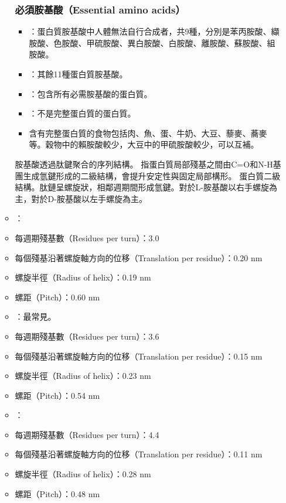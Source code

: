 \documentclass[a4paper,12pt]{report}
\begin{document}
\begin{itemize}
\begin{itemize}
\subsubsection{必須胺基酸（Essential amino acids）}
\begin{itemize}
\item {}：蛋白質胺基酸中人體無法自行合成者，共9種，分別是苯丙胺酸、纈胺酸、色胺酸、甲硫胺酸、異白胺酸、白胺酸、離胺酸、蘇胺酸、組胺酸。
\item {}：其餘11種蛋白質胺基酸。
\item {}：包含所有必需胺基酸的蛋白質。
\item {}：不是完整蛋白質的蛋白質。
\item 含有完整蛋白質的食物包括肉、魚、蛋、牛奶、大豆、藜麥、蕎麥等。穀物中的賴胺酸較少，大豆中的甲硫胺酸較少，可以互補。
\end{itemize}
胺基酸透過肽鍵聚合的序列結構。
指蛋白質局部殘基之間由C=O和N-H基團生成氫鍵形成的二級結構，會提升安定性與固定局部構形。
蛋白質二級結構。肽鏈呈螺旋狀，相鄰週期間形成氫鍵。對於L-胺基酸以右手螺旋為主，對於D-胺基酸以左手螺旋為主。
\bit
\item {}：
\bit
\item 每週期殘基數（Residues per turn）：3.0
\item 每個殘基沿著螺旋軸方向的位移（Translation per residue）：0.20 nm
\item 螺旋半徑（Radius of helix）：0.19 nm
\item 螺距（Pitch）：0.60 nm
\eit
\item {}：最常見。
\bit
\item 每週期殘基數（Residues per turn）：3.6
\item 每個殘基沿著螺旋軸方向的位移（Translation per residue）：0.15 nm
\item 螺旋半徑（Radius of helix）：0.23 nm
\item 螺距（Pitch）：0.54 nm
\eit
\item {}：
\bit
\item 每週期殘基數（Residues per turn）：4.4
\item 每個殘基沿著螺旋軸方向的位移（Translation per residue）：0.11 nm
\item 螺旋半徑（Radius of helix）：0.28 nm
\item 螺距（Pitch）：0.48 nm

\end{itemize}
\end{itemize}
\end{document}
